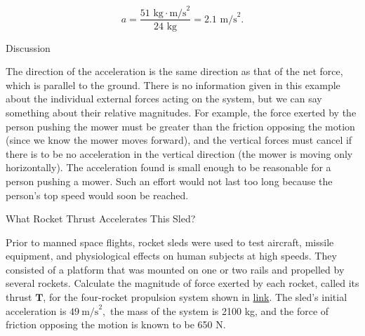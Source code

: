 \documentclass[
]{book}
\newenvironment{tinysection}{}{}
\begin{document}
\leavevmode\hypertarget{eip-id2603472}{}%
\[{{{a = \frac{\text{51\ kg} \cdot \text{m/s}^{2}}{\text{24\ kg}}} =}\text{2.1\ m}\text{/s}^{2}}.\]

\begin{tinysection}

{Discussion}

\end{tinysection}

The direction of the acceleration is the same direction as that of the
net force, which is parallel to the ground. There is no information
given in this example about the individual external forces acting on the
system, but we can say something about their relative magnitudes. For
example, the force exerted by the person pushing the mower must be
greater than the friction opposing the motion (since we know the mower
moves forward), and the vertical forces must cancel if there is to be no
acceleration in the vertical direction (the mower is moving only
horizontally). The acceleration found is small enough to be reasonable
for a person pushing a mower. Such an effort would not last too long
because the person's top speed would soon be reached.

\hypertarget{fs-id2654781}{}
What Rocket Thrust Accelerates This Sled?

Prior to manned space flights, rocket sleds were used to test aircraft,
missile equipment, and physiological effects on human subjects at high
speeds. They consisted of a platform that was mounted on one or two
rails and propelled by several rockets. Calculate the magnitude of force
exerted by each rocket, called its thrust \(\textbf{T}{}\), for the
four-rocket propulsion system shown in
\protect\hyperlink{fs-id2407992}{link}. The sled's initial
acceleration is \({{\text{49}\ \text{m/s}^{2}},}{}\) the mass of the
system is 2100 kg, and the force of friction opposing the motion is
known to be 650 N.
\end{document}
